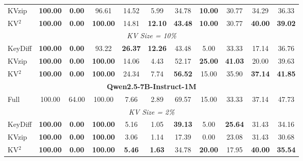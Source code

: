 \documentclass[11pt]{article}
\begin{document}
\begin{table}[htbp]
\begin{tabular}{l|ccc|cccc|c|c|c}
KVzip 
    & \textbf{100.00} & \textbf{0.00} & 96.61
    & 14.52 & 5.99 & 34.78 & \textbf{10.00}
    & 30.77
    & 34.29
    & 36.33 \\

KV$^2$
    & \textbf{100.00} & \textbf{0.00} & \textbf{100.00}
    & 14.81 & \textbf{12.10} & \textbf{43.48} & \textbf{10.00}
    & 30.77
    & \textbf{40.00}
    & \textbf{39.02} \\

\midrule
\multicolumn{11}{c}{\textit{KV Size = 10\%}} \\
\midrule

KeyDiff 
    & \textbf{100.00} & \textbf{0.00} & 93.22
    & \textbf{26.37} & \textbf{12.26} & 43.48 & 5.00
    & 33.33
    & 17.14
    & 36.76 \\

KVzip 
    & \textbf{100.00} & \textbf{0.00} & \textbf{100.00}
    & 14.06 & 4.43 & 52.17 & \textbf{25.00}
    & \textbf{41.03}
    & 20.00
    & 39.63 \\

KV$^2$
    & \textbf{100.00} & \textbf{0.00} & \textbf{100.00}
    & 24.34 & 7.74 & \textbf{56.52} & 15.00
    & 35.90
    & \textbf{37.14}
    & \textbf{41.85} \\

\midrule
\multicolumn{11}{c}{\textbf{Qwen2.5-7B-Instruct-1M}} \\
\midrule

Full
    & 100.00 & 64.00 & 100.00
    & 7.66 & 2.89 & 69.57 & 15.00
    & 33.33
    & 37.14
    & 47.73 \\

\midrule
\multicolumn{11}{c}{\textit{KV Size = 2\%}} \\
\midrule

KeyDiff
    & \textbf{100.00} & \textbf{0.00} & \textbf{100.00}
    & 5.16 & 1.05 & \textbf{39.13} & 5.00
    & \textbf{25.64}
    & 31.43
    & 34.16 \\

KVzip
    & \textbf{100.00} & \textbf{0.00} & \textbf{100.00}
    & 3.06 & 1.14 & 17.39 & 0.00
    & 23.08
    & 31.43
    & 30.68 \\

KV$^2$
    & \textbf{100.00} & \textbf{0.00} & \textbf{100.00}
    & \textbf{5.46} & \textbf{1.63} & 34.78 & \textbf{20.00}
    & 17.95
    & \textbf{40.00}
    & \textbf{35.54} \\


\end{tabular}
\end{table}
\end{document}
